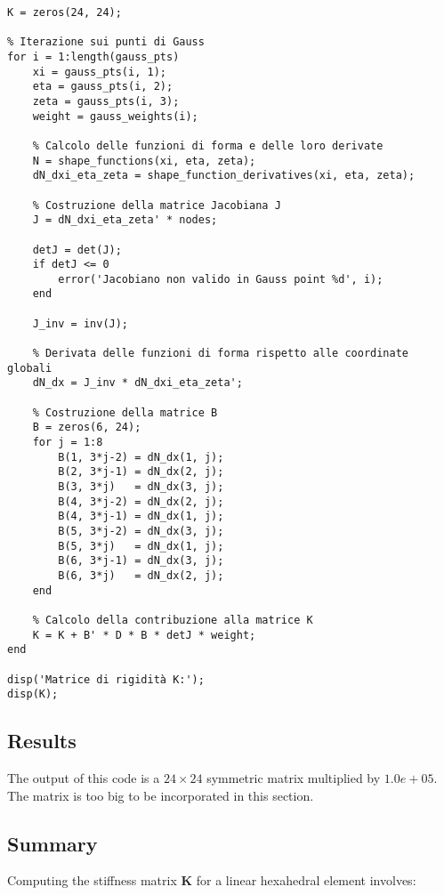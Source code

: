 \documentclass{article}
\begin{document}
\begin{lstlisting}[caption={MATLAB Code for the stiffness matrix}, label={lst:stiffness matrix}]
% Inizializzazione della matrice di rigidità K
K = zeros(24, 24);

% Iterazione sui punti di Gauss
for i = 1:length(gauss_pts)
    xi = gauss_pts(i, 1);
    eta = gauss_pts(i, 2);
    zeta = gauss_pts(i, 3);
    weight = gauss_weights(i);
    
    % Calcolo delle funzioni di forma e delle loro derivate
    N = shape_functions(xi, eta, zeta);
    dN_dxi_eta_zeta = shape_function_derivatives(xi, eta, zeta);
    
    % Costruzione della matrice Jacobiana J
    J = dN_dxi_eta_zeta' * nodes;
    
    detJ = det(J);
    if detJ <= 0
        error('Jacobiano non valido in Gauss point %d', i);
    end
    
    J_inv = inv(J);
    
    % Derivata delle funzioni di forma rispetto alle coordinate globali
    dN_dx = J_inv * dN_dxi_eta_zeta';
    
    % Costruzione della matrice B
    B = zeros(6, 24);
    for j = 1:8
        B(1, 3*j-2) = dN_dx(1, j);
        B(2, 3*j-1) = dN_dx(2, j);
        B(3, 3*j)   = dN_dx(3, j);
        B(4, 3*j-2) = dN_dx(2, j);
        B(4, 3*j-1) = dN_dx(1, j);
        B(5, 3*j-2) = dN_dx(3, j);
        B(5, 3*j)   = dN_dx(1, j);
        B(6, 3*j-1) = dN_dx(3, j);
        B(6, 3*j)   = dN_dx(2, j);
    end
    
    % Calcolo della contribuzione alla matrice K
    K = K + B' * D * B * detJ * weight;
end

disp('Matrice di rigidità K:');
disp(K);
\end{lstlisting}

\subsection{Results}
The output of this code is a $24\times24$ symmetric matrix multiplied by $1.0e+05$. The matrix is too big to be incorporated in this section.

\subsection{Summary}

Computing the stiffness matrix $ \mathbf{K} $ for a linear hexahedral element involves:
\end{document}
